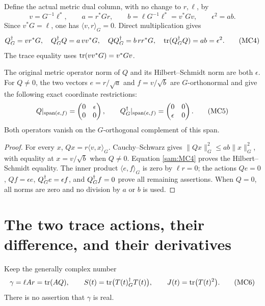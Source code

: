 Define the actual metric dual column, with no change to \(r,\ell\), by
\begin{equation}
 v=G^{-1}\ell^*,\qquad
 a=r^*Gr,\qquad b=\ell G^{-1}\ell^*=v^*Gv,\qquad
 \epsilon^2=ab.
 \tag{MC3}\label{sam:MC3}
\end{equation}
Since \(v^*G=\ell\), one has \(\langle v,r\rangle_G=0\).
Direct multiplication gives
\begin{equation}
 Q^\dagger_G=vr^*G,\quad
 Q^\dagger_G Q=a\,vv^*G,\quad QQ^\dagger_G=b\,rr^*G,\quad
 \operatorname{tr}(Q^\dagger_G Q)=ab=\epsilon^2.
 \tag{MC4}\label{sam:MC4}
\end{equation}
The trace equality uses \(\operatorname{tr}(vv^*G)=v^*Gv\).

\begin{samlemma}
The original metric operator norm of \(Q\) and its Hilbert--Schmidt norm
are both \(\epsilon\). For \(Q\ne0\), the two vectors
\(e=r/\sqrt a\) and \(f=v/\sqrt b\) are \(G\)-orthonormal and give
the following exact coordinate restrictions:
\begin{equation}
 Q|_{\operatorname{span}(e,f)}
 =\begin{pmatrix}0&\epsilon\\0&0\end{pmatrix},\qquad
 Q^\dagger_G|_{\operatorname{span}(e,f)}
 =\begin{pmatrix}0&0\\\epsilon&0\end{pmatrix}.
 \tag{MC5}\label{sam:MC5}
\end{equation}
Both operators vanish on the \(G\)-orthogonal complement of this span.
\end{samlemma}
\begin{proof}
For every \(x\), \(Qx=r\langle v,x\rangle_G\). Cauchy--Schwarz gives
\(\|Qx\|_G^2\le ab\|x\|_G^2\), with equality at \(x=v/\sqrt b\)
when \(Q\ne0\). Equation \eqref{sam:MC4} proves the Hilbert--Schmidt equality.
The inner product \(\langle e,f\rangle_G\) is zero by \(\ell r=0\);
the actions \(Qe=0\), \(Qf=\epsilon e\), \(Q^\dagger_G e=\epsilon f\),
and \(Q^\dagger_G f=0\) prove all remaining assertions. When \(Q=0\), all
norms are zero and no division by \(a\) or \(b\) is used.
\end{proof}

\section{The two trace actions, their difference, and their derivatives}

Keep the generally complex number
\begin{equation}
 \gamma=\ell Ar=\operatorname{tr}(AQ),\qquad
 S(t)=\operatorname{tr}\bigl(T(t)^\dagger_G T(t)\bigr),\qquad
 J(t)=\operatorname{tr}\bigl(T(t)^2\bigr).
 \tag{MC6}\label{sam:MC6}
\end{equation}
There is no assertion that \(\gamma\) is real.

